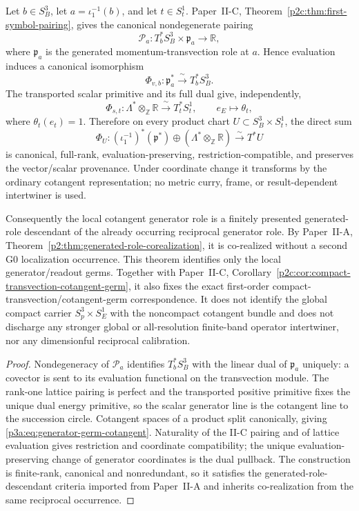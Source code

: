 \documentclass[12pt,a4paper]{article}
\begin{document}
\begin{theorem}
\label{p3a:thm:canonical-generator-germ-localization}
Let \(b\in S_B^3\), let \(a=\iota_1^{-1}(b)\), and let \(t\in S_t^1\).
Paper~II-C, Theorem~\ref{p2c:thm:first-symbol-pairing}, gives the canonical
nondegenerate pairing
\[
 \mathcal P_a:T_b^*S_B^3\times\mathfrak p_a\longrightarrow\mathbb R,
\]
where \(\mathfrak p_a\) is the generated momentum-transvection role at \(a\).
Hence evaluation induces a canonical isomorphism
\[
 \Phi_{v,b}:\mathfrak p_a^*\xrightarrow{\ \sim\ }T_b^*S_B^3.
\]
The transported scalar primitive and its full dual give, independently,
\[
 \Phi_{s,t}:\Lambda^*\otimes_\mathbb Z\mathbb R
 \xrightarrow{\ \sim\ }T_t^*S_t^1,
 \qquad e_E\longmapsto\theta_t,
\]
where \(\theta_t(e_t)=1\).  Therefore on every product chart
\(U\subset S_B^3\times S_t^1\), the direct sum
\begin{equation}
\label{p3a:eq:generator-germ-cotangent}
 \boxed{
 \Phi_U:
 (\iota_1^{-1})^*(\mathfrak p^*)\oplus
 (\Lambda^*\otimes_\mathbb Z\mathbb R)
 \xrightarrow{\ \sim\ }T^*U }
\end{equation}
is canonical, full-rank, evaluation-preserving, restriction-compatible, and
preserves the vector/scalar provenance.  Under coordinate change it transforms
by the ordinary cotangent representation; no metric curry, frame, or
result-dependent intertwiner is used.

Consequently the local cotangent generator role is a finitely presented
generated-role descendant of the already occurring reciprocal generator role.
By Paper~II-A, Theorem~\ref{p2:thm:generated-role-corealization}, it is
co-realized without a second G0 localization occurrence.  This theorem
identifies only the local generator/readout germs.  Together with Paper~II-C,
Corollary~\ref{p2c:cor:compact-transvection-cotangent-germ}, it also fixes the
exact first-order compact-transvection/cotangent-germ correspondence.  It does
not identify the global compact carrier \(S_p^3\times S_E^1\) with the
noncompact cotangent bundle and does not discharge any stronger global or
all-resolution finite-band operator intertwiner, nor any dimensionful
reciprocal calibration.
\end{theorem}

\begin{proof}
Nondegeneracy of \(\mathcal P_a\) identifies \(T_b^*S_B^3\) with the linear
dual of \(\mathfrak p_a\) uniquely: a covector is sent to its evaluation
functional on the transvection module.  The rank-one lattice pairing is
perfect and the transported positive primitive fixes the unique dual energy
primitive, so the scalar generator line is the cotangent line to the
succession circle.  Cotangent spaces of a product split canonically, giving
\eqref{p3a:eq:generator-germ-cotangent}.  Naturality of the II-C pairing and
of lattice evaluation gives restriction and coordinate compatibility; the
unique evaluation-preserving change of generator coordinates is the dual
pullback.  The construction is finite-rank, canonical and nonredundant, so it
satisfies the generated-role-descendant criteria imported from Paper~II-A and
inherits co-realization from the same reciprocal occurrence.
\end{proof}
\end{document}
